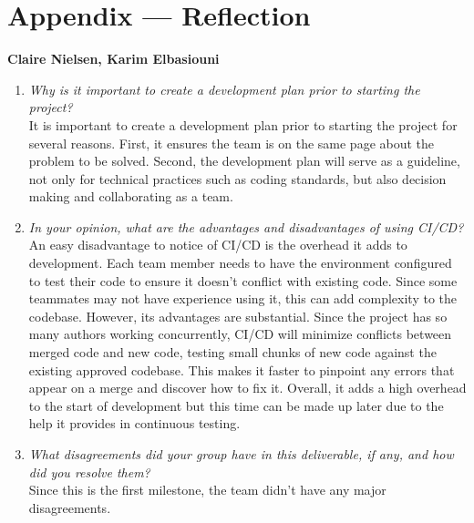 \documentclass{article}
\begin{document}
\newpage{}

\section*{Appendix --- Reflection}

\textbf{Claire Nielsen, Karim Elbasiouni}
\begin{enumerate}
    \item \textit{Why is it important to create a development plan prior to starting the project?}\\
    It is important to create a development plan prior to starting the project for several reasons. First, it ensures the team is on the same page about the problem to be solved. Second, the development plan will serve as a guideline, not only for technical practices such as coding standards, but also decision making and collaborating as a team.
    \item \textit{In your opinion, what are the advantages and disadvantages of using CI/CD?}\\
    An easy disadvantage to notice of CI/CD is the overhead it adds to development. Each team member needs to have the environment configured to test their code to ensure it doesn’t conflict with existing code. Since some teammates may not have experience using it, this can add complexity to the codebase. However, its advantages are substantial. Since the project has so many authors working concurrently, CI/CD will minimize conflicts between merged code and new code, testing small chunks of new code against the existing approved codebase. This makes it faster to pinpoint any errors that appear on a merge and discover how to fix it. Overall, it adds a high overhead to the start of development but this time can be made up later due to the help it provides in continuous testing. 
    \item \textit{What disagreements did your group have in this deliverable, if any, and how did you resolve them?}\\
    Since this is the first milestone, the team didn’t have any major disagreements. 
\end{enumerate}
\end{document}
